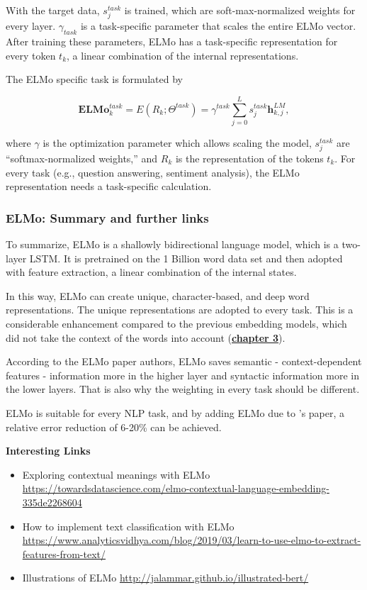 \documentclass[]{krantz}
\providecommand{\tightlist}{%
  \setlength{\itemsep}{0pt}\setlength{\parskip}{0pt}}
\begin{document}
With the target data, \(s_j^{task}\) is trained, which are soft-max-normalized weights for every layer. \(\gamma_{task}\) is a task-specific parameter that scales the entire ELMo vector.
After training these parameters, ELMo has a task-specific representation for every token \(t_k\), a linear combination of the internal representations.

The ELMo specific task is formulated by

\[\mathbf{E} \mathbf{L} \mathbf{M} \mathbf{o}_{k}^{t a s k}=E\left(R_{k} ; \Theta^{t a s k}\right)=\gamma^{t a s k} \sum_{j=0}^{L} s_{j}^{t a s k} \mathbf{h}_{k, j}^{L M},\]

where \(\gamma\) is the optimization parameter which allows scaling the model, \(s_{j}^{t a s k}\) are ``softmax-normalized weights,'' and \(R_{k}\) is the representation of the tokens \(t_k\). For every task (e.g., question answering, sentiment analysis), the ELMo representation needs a task-specific calculation.

\hypertarget{elmo-summary-and-further-links}{%
\subsubsection{ELMo: Summary and further links}\label{elmo-summary-and-further-links}}

To summarize, ELMo is a shallowly bidirectional language model, which is a two-layer LSTM. It is pretrained on the 1 Billion word data set and then adopted with feature extraction, a linear combination of the internal states.

In this way, ELMo can create unique, character-based, and deep word representations. The unique representations are adopted to every task. This is a considerable enhancement compared to the previous embedding models, which did not take the context of the words into account (\protect\hyperlink{foundationsapplications-of-modern-nlp}{\textbf{chapter 3}}).

According to the ELMo paper authors, ELMo saves semantic - context-dependent features - information more in the higher layer and syntactic information more in the lower layers. That is also why the weighting in every task should be different.

ELMo is suitable for every NLP task, and by adding ELMo due to \citet{peter2018}'s paper, a relative error reduction of 6-20\% can be achieved.

\textbf{Interesting Links}

\begin{itemize}
\tightlist
\item
  Exploring contextual meanings with ELMo \url{https://towardsdatascience.com/elmo-contextual-language-embedding-335de2268604}
\item
  How to implement text classification with ELMo \url{https://www.analyticsvidhya.com/blog/2019/03/learn-to-use-elmo-to-extract-features-from-text/}
\item
  Illustrations of ELMo \url{http://jalammar.github.io/illustrated-bert/}
\end{itemize}
\end{document}
